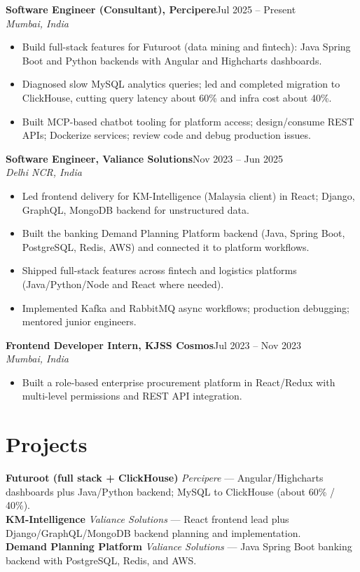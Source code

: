 \documentclass[9pt,letterpaper]{extarticle}
\newcommand{\job}[3]{%
  \noindent\textbf{#1}\hfill{#2}\\[0pt]
  \noindent\textit{#3}\vspace{1.5pt}\par
}
\begin{document}
\job{Software Engineer (Consultant), Percipere}{Jul 2025 -- Present}{Mumbai, India}
\begin{itemize}
  \item Build full-stack features for Futuroot (data mining and fintech): Java Spring Boot and Python backends with Angular and Highcharts dashboards.
  \item Diagnosed slow MySQL analytics queries; led and completed migration to ClickHouse, cutting query latency about 60\% and infra cost about 40\%.
  \item Built MCP-based chatbot tooling for platform access; design/consume REST APIs; Dockerize services; review code and debug production issues.
\end{itemize}

\job{Software Engineer, Valiance Solutions}{Nov 2023 -- Jun 2025}{Delhi NCR, India}
\begin{itemize}
  \item Led frontend delivery for KM-Intelligence (Malaysia client) in React; Django, GraphQL, MongoDB backend for unstructured data.
  \item Built the banking Demand Planning Platform backend (Java, Spring Boot, PostgreSQL, Redis, AWS) and connected it to platform workflows.
  \item Shipped full-stack features across fintech and logistics platforms (Java/Python/Node and React where needed).
  \item Implemented Kafka and RabbitMQ async workflows; production debugging; mentored junior engineers.
\end{itemize}

\job{Frontend Developer Intern, KJSS Cosmos}{Jul 2023 -- Nov 2023}{Mumbai, India}
\begin{itemize}
  \item Built a role-based enterprise procurement platform in React/Redux with multi-level permissions and REST API integration.
\end{itemize}

\section*{Projects}
\noindent\textbf{Futuroot (full stack + ClickHouse)} \textit{Percipere} --- Angular/Highcharts dashboards plus Java/Python backend; MySQL to ClickHouse (about 60\% / 40\%).\\[2pt]
\noindent\textbf{KM-Intelligence} \textit{Valiance Solutions} --- React frontend lead plus Django/GraphQL/MongoDB backend planning and implementation.\\[2pt]
\noindent\textbf{Demand Planning Platform} \textit{Valiance Solutions} --- Java Spring Boot banking backend with PostgreSQL, Redis, and AWS.
\end{document}
